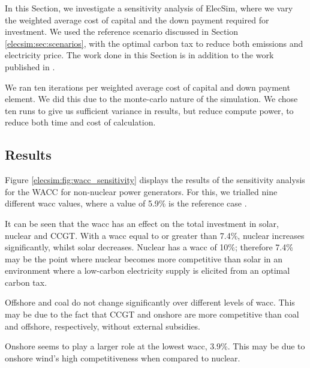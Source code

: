 In this Section, we investigate a sensitivity analysis of ElecSim, where we vary the weighted average cost of capital and the down payment required for investment. We used the reference scenario discussed in Section \ref{elecsim:sec:scenarios}, with the optimal carbon tax to reduce both emissions and electricity price. The work done in this Section is in addition to the work published in \cite{Kell2020}.

We ran ten iterations per weighted average cost of capital and down payment element. We did this due to the monte-carlo nature of the simulation. We chose ten runs to give us sufficient variance in results, but reduce compute power, to reduce both time and cost of calculation.

\subsection{Results}

Figure \ref{elecsim:fig:wacc_sensitivity} displays the results of the sensitivity analysis for the \Gls{WACC} for non-nuclear power generators. For this, we trialled nine different \acrfull{wacc} values, where a value of 5.9\% is the reference case \cite{KincheloeStephenC1990TWAC}. 

It can be seen that the \acrshort{wacc} has an effect on the total investment in solar, nuclear and CCGT. With a \acrshort{wacc} equal to or greater than 7.4\%, nuclear increases significantly, whilst solar decreases. Nuclear has a \acrshort{wacc} of 10\%; therefore 7.4\% may be the point where nuclear becomes more competitive than solar in an environment where a low-carbon electricity supply is elicited from an optimal carbon tax.

Offshore and coal do not change significantly over different levels of \acrshort{wacc}. This may be due to the fact that CCGT and onshore are more competitive than coal and offshore, respectively, without external subsidies. 

Onshore seems to play a larger role at the lowest \acrshort{wacc}, 3.9\%. This may be due to onshore wind's high competitiveness when compared to nuclear.



